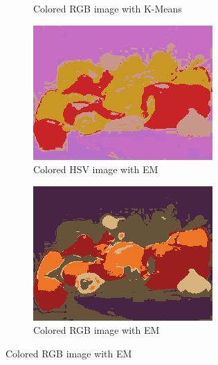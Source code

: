 \documentclass[sigconf,authorversion]{acmart}
\begin{document}
\begin{figure}[hbtp]
\begin{subfigure}[b]{0.45\columnwidth}
      \caption{Colored RGB image with K-Means}
      \label{subfig:peppers_rgb_kmeans}
  \end{subfigure}

  \begin{subfigure}[b]{0.45\columnwidth}
      \includegraphics[width=\columnwidth]{../outputs/peppers2_5_hsv_colored_gmm.png}
      \caption{Colored HSV image with EM}
      \label{subfig:peppers_hsv_gmm}
  \end{subfigure}
  \hspace{0.05\columnwidth}
  \begin{subfigure}[b]{0.45\columnwidth}
      \includegraphics[width=\columnwidth]{../outputs/peppers2_5_rgb_colored_gmm.png}
      \caption{Colored RGB image with EM}
      \label{subfig:peppers_rgb_gmm}
  \end{subfigure}


\end{figure}
\end{document}

